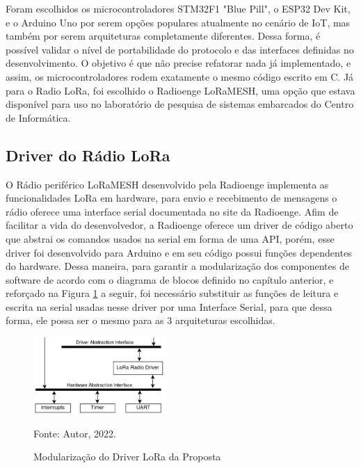\newpage

Foram escolhidos os microcontroladores STM32F1 "Blue Pill", o ESP32 Dev Kit,
e o Arduino Uno
por serem opções populares atualmente no cenário de IoT, mas também por serem
arquiteturas completamente diferentes. Dessa forma, é possível validar o nível
de portabilidade do protocolo e das interfaces definidas no desenvolvimento. O
objetivo é que não precise refatorar nada já implementado, e assim, os
microcontroladores rodem exatamente o mesmo código escrito em C. Já para o
Radio LoRa, foi escolhido o Radioenge LoRaMESH, uma opção que estava disponível
para uso no laboratório de pesquisa de sistemas embarcados do Centro de Informática.

\subsection{Driver do Rádio LoRa}

O Rádio periférico LoRaMESH desenvolvido pela Radioenge implementa as funcionalidades
LoRa em hardware, para envio e recebimento de mensagens o
rádio oferece uma interface serial documentada no site da Radioenge. Afim de
facilitar a vida do desenvolvedor, a Radioenge oferece um driver de código aberto
que abstrai os comandos usados na serial em forma de uma API, porém, esse driver
foi desenvolvido para Arduino e em seu código possui funções dependentes do
hardware. Dessa maneira, para garantir a modularização dos componentes de software
de acordo com o diagrama de blocos definido no capítulo anterior, e reforçado na Figura
\ref{fig:lora-driver} a seguir, foi necessário substituir as funções de leitura
e escrita na serial usadas nesse driver por uma Interface Serial, para que dessa forma,
ele possa ser o mesmo para as 3 arquiteturas escolhidas.

\begin{figure}[H]
    \centering
	\caption{Modularização do Driver LoRa da Proposta}
    \includegraphics[width=0.45\textwidth,keepaspectratio]{img/lora-driver.png}
    \label{fig:lora-driver}
    
    Fonte: Autor, 2022.
\end{figure}

